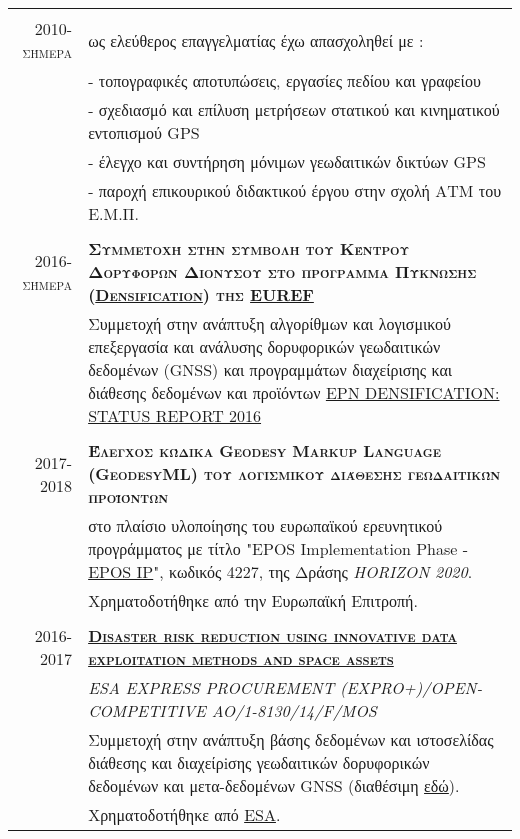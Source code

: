 \documentclass[a4paper,10pt]{article} %
\begin{document}
\begin{longtable}{r|p{13cm}}

\multicolumn{2}{c}{} \\
\textsc{2010-σήμερα} & ως ελεύθερος επαγγελματίας έχω απασχοληθεί με :\\ 
  & - τοπογραφικές αποτυπώσεις, εργασίες πεδίου και γραφείου \\
  & - σχεδιασμό και επίλυση μετρήσεων στατικού και κινηματικού εντοπισμού GPS\\
  & - έλεγχο και συντήρηση μόνιμων γεωδαιτικών δικτύων GPS\\
  & - παροχή επικουρικού διδακτικού έργου στην σχολή ΑΤΜ του Ε.Μ.Π. \\

\multicolumn{2}{c}{} \\
 \textsc{2016-σήμερα} & \textbf{\textsc{Συμμετοχή στην συμβολή του Κέντρου Δορυφόρων Διονύσου στο πρόγραμμα Πύκνωσης (\href{http://www.epncb.oma.be/_densification}{Densification}) της \href{http://www.epncb.oma.be}{EUREF}}}\\
  & Συμμετοχή στην ανάπτυξη αλγορίθμων και λογισμικού επεξεργασία και ανάλυσης δορυφορικών γεωδαιτικών δεδομένων (GNSS) και προγραμμάτων διαχείρισης και διάθεσης δεδομένων και προϊόντων \href{http://www.euref.eu/symposia/2016SanSebastian/02-02-Kenyeres.pdf}{EPN DENSIFICATION: STATUS REPORT 2016}\\

\multicolumn{2}{c}{} \\
\textsc{2017-2018} & \textbf{\textsc{Έλεγχος κώδικα Geodesy Markup Language (GeodesyML) του λογισμικού διάθεσης γεωδαιτικών προϊόντων}}\\
  & στο πλαίσιο υλοποίησης του ευρωπαϊκού ερευνητικού προγράμματος με τίτλο "EPOS Implementation Phase - \href{https://www.epos-ip.org/node/147}{EPOS IP}", κωδικός 4227, της Δράσης \textit{HORIZON 2020}.\\
  & Χρηματοδοτήθηκε από την Ευρωπαϊκή Επιτροπή.\\
  

\multicolumn{2}{c}{} \\
\textsc{2016-2017} & \textbf{\textsc{\href{http://www.astro.noa.gr/gr/research/projects/esa/}{Disaster risk reduction using innovative data exploitation methods and space assets}}}\\
  & \textit{\small ESA EXPRESS PROCUREMENT (EXPRO+)/OPEN-COMPETITIVE AO/1-8130/14/F/MOS}\\
  & Συμμετοχή στην ανάπτυξη βάσης δεδομένων και ιστοσελίδας διάθεσης και διαχείρiσης γεωδαιτικών δορυφορικών δεδομένων και μετα-δεδομένων GNSS (διαθέσιμη \href{http://ddrgsac.noa-gsp.terradue.com/ddrgsac}{εδώ}).\\
  & Χρηματοδοτήθηκε από \href{http://www.esa.int/ESA}{ESA}.\\


\end{longtable}
\end{document}
